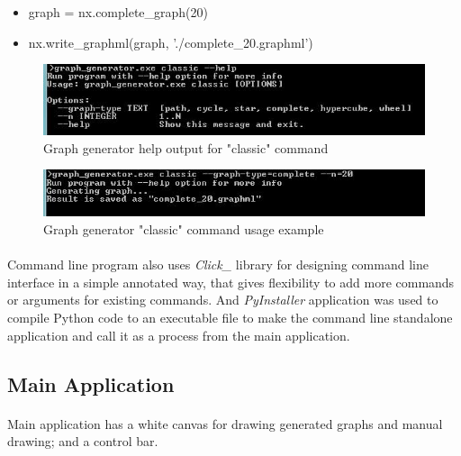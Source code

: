 \documentclass[a4paper,TexShade]{class}
\begin{document}
\begin{itemize}
\item graph = nx.complete\_graph(20)
\item nx.write\_graphml(graph, './complete\_20.graphml')
\end{itemize}
\bigskip

\begin{figure}[ht]
\centering
\caption{Graph generator help output for "classic" command} \label{generator2}
\includegraphics[width=0.9\linewidth ,natwidth=570,natheight=106]{images/generator_screen2.png}
\end{figure}

\begin{figure}[ht]
\centering
\caption{Graph generator "classic" command usage example}
\includegraphics[width=0.9\linewidth ,natwidth=569,natheight=70]{images/generator_screen3.png}
\end{figure}

\paragraph{} Command line program also uses \textit{Click\_} \cite{click} library for designing command line interface in a simple annotated way, that gives flexibility to add more commands or arguments for existing commands. And \textit{PyInstaller} \cite{pyinstaller} application was used to compile Python code to an executable file to make the command line standalone application and call it as a process from the main application.


\bigskip
\newpage
\subsection{Main Application}

\paragraph{} Main application has a white canvas for drawing generated graphs and manual drawing; and a control bar. 
\end{document}

